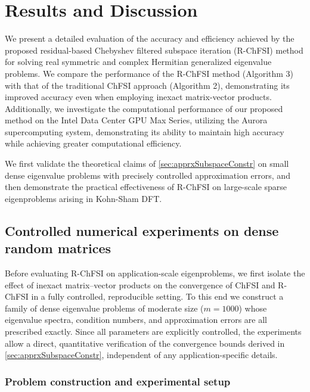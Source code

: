 \documentclass[preprint,3p,number,sort&compress]{elsarticle}
\newcommand{\cblue }{\color{black}}
\begin{document}
\section{Results and Discussion}
We present a detailed evaluation of the accuracy and efficiency achieved by the proposed residual-based Chebyshev filtered subspace iteration (R-ChFSI) method for solving real symmetric and complex Hermitian generalized eigenvalue problems. We compare the performance of the R-ChFSI method (Algorithm 3) with that of the traditional ChFSI approach (Algorithm 2), demonstrating its improved accuracy even when employing inexact matrix-vector products. Additionally, we investigate the computational performance of our proposed method on the Intel Data Center GPU Max Series, utilizing the Aurora supercomputing system, demonstrating its ability to maintain high accuracy while achieving greater computational efficiency. {\cblue We first validate the theoretical claims of \cref{sec:apprxSubspaceConstr} on small dense eigenvalue problems with precisely controlled approximation errors, and then demonstrate the practical effectiveness of R-ChFSI on large-scale sparse eigenproblems arising in Kohn-Sham DFT.

\subsection{Controlled numerical experiments on dense random matrices}\label{sec:toyExperiments}
Before evaluating R-ChFSI on application-scale eigenproblems, we first isolate the effect of inexact matrix--vector products on the convergence of ChFSI and R-ChFSI in a fully controlled, reproducible setting. To this end we construct a family of dense eigenvalue problems of moderate size ($m=1000$) whose eigenvalue spectra, condition numbers, and approximation errors are all prescribed exactly. Since all parameters are explicitly controlled, the experiments allow a direct, quantitative verification of the convergence bounds derived in \cref{sec:apprxSubspaceConstr}, independent of any application-specific details.

\subsubsection{Problem construction and experimental setup}\label{sec:toySetup}

}
\end{document}
